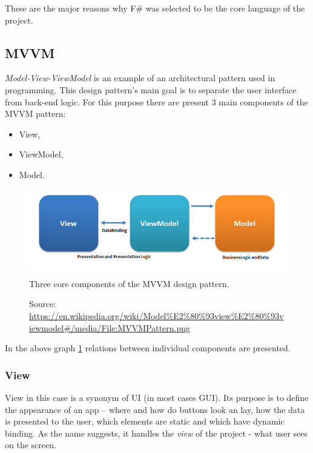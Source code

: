    These are the major reasons why F\# was selected to be the core language of the project.
\subsection{MVVM}
    \textit{Model-View-ViewModel} is an example of an architectural pattern used in programming. This design pattern's main goal is to separate the user interface from back-end logic. For this purpose there are present 3 main components of the MVVM pattern:
    \begin{itemize}
        \item View,
        \item ViewModel,
        \item Model.
    \end{itemize}
    
    \begin{figure}[H]
        \centering
        \includegraphics[width=\textwidth]{img/MVVMPattern.png}
        \caption{Three core components of the MVVM design pattern.}
        \label{fig:mvvm_pattern}
        \caption*{Source: \url{https://en.wikipedia.org/wiki/Model\%E2\%80\%93view\%E2\%80\%93viewmodel\#/media/File:MVVMPattern.png}}
    \end{figure}
    
    In the above graph \ref{fig:mvvm_pattern} relations between individual components are presented.
    
    \subsubsection{View}
        View in this case is a synonym of UI (in most cases GUI). Its purpose is to define the appearance of an app -- where and how do buttons look an lay, how the data is presented to the user, which elements are static and which have dynamic binding. As the name suggests, it handles the \textit{view} of the project - what user sees on the screen.
        
